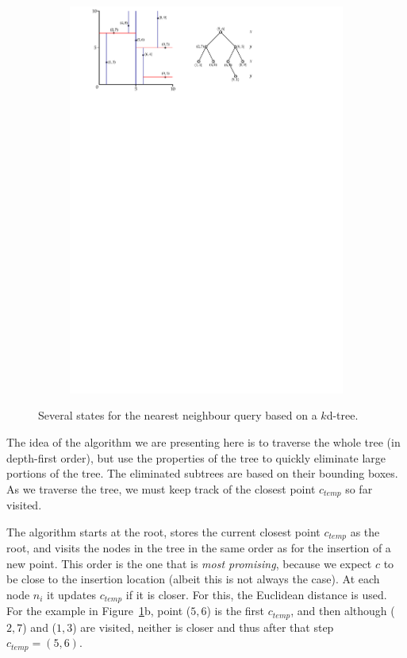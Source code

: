 \begin{figure}[tbp]
\begin{subfigure}[b]{0.6\linewidth}
    \includegraphics[page=5,width=\textwidth]{figs/kdtree_nn.pdf}
    \caption{}
  \end{subfigure}

\caption{Several states for the nearest neighbour query based on a $k$d-tree.}
\label{fig:kdtree_nn}
\end{figure}


%

The idea of the algorithm we are presenting here is to traverse the whole tree (in depth-first order), but use the properties of the tree to quickly eliminate large portions of the tree.
The eliminated subtrees are based on their bounding boxes.
As we traverse the tree, we must keep track of the closest point $c_{temp}$ so far visited.


The algorithm starts at the root, stores the current closest point $c_{temp}$ as the root, and visits the nodes in the tree in the same order as for the insertion of a new point.
This order is the one that is \emph{most promising}, because we expect $c$ to be close to the insertion location (albeit this is not always the case).
At each node $n_i$ it updates $c_{temp}$ if it is closer.
For this, the Euclidean distance is used.
For the example in Figure~\ref{fig:kdtree_nn}b, point ($5,6$) is the first $c_{temp}$, and then although ($2,7$) and ($1,3$) are visited, neither is closer and thus after that step $c_{temp} = (5,6)$.

